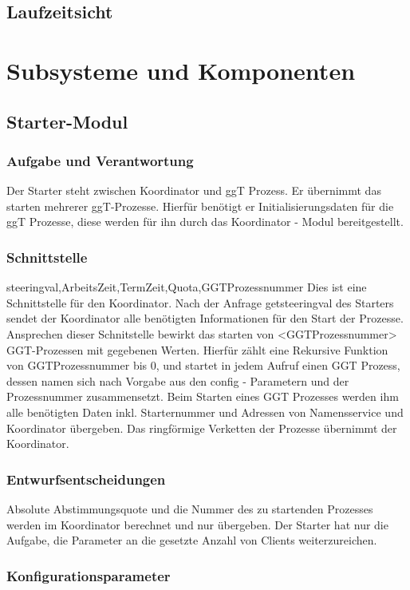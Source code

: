 \documentclass{article}
\begin{document}
\subsection{Laufzeitsicht}

\newpage

\section{Subsysteme und Komponenten}

\subsection{Starter-Modul}
\subsubsection{Aufgabe und Verantwortung}

Der Starter steht zwischen Koordinator und ggT Prozess. Er übernimmt das starten mehrerer ggT-Prozesse.
Hierfür benötigt er Initialisierungsdaten für die ggT Prozesse, diese werden für ihn durch das Koordinator - Modul
bereitgestellt.


\subsubsection{Schnittstelle}
{steeringval,ArbeitsZeit,TermZeit,Quota,GGTProzessnummer}
Dies ist eine Schnittstelle für den Koordinator. Nach der Anfrage getsteeringval des Starters sendet der Koordinator alle
benötigten Informationen für den Start der Prozesse. Ansprechen dieser Schnitstelle bewirkt das starten von <GGTProzessnummer>
GGT-Prozessen mit gegebenen Werten.
Hierfür zählt eine Rekursive Funktion von GGTProzessnummer bis 0, und startet in jedem Aufruf einen GGT Prozess,
dessen namen sich nach Vorgabe aus den config - Parametern und der Prozessnummer zusammensetzt.
Beim Starten eines GGT Prozesses werden ihm alle benötigten Daten inkl. Starternummer und Adressen von Namensservice und
Koordinator übergeben. Das ringförmige Verketten der Prozesse übernimmt der Koordinator.

\subsubsection{Entwurfsentscheidungen}
Absolute Abstimmungsquote und die Nummer des zu startenden Prozesses werden im Koordinator berechnet und nur übergeben.
Der Starter hat nur die Aufgabe, die Parameter an die gesetzte Anzahl von Clients weiterzureichen.


\subsubsection{Konfigurationsparameter}

\newpage
\end{document}
